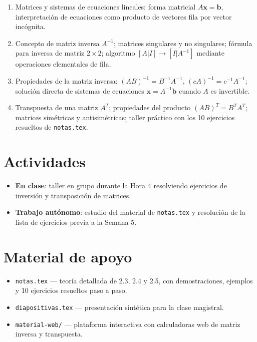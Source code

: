 \documentclass[11pt,letterpaper]{article}
\newcommand{\vv}[1]{\mathbf{#1}}
\begin{document}
\begin{enumerate}[leftmargin=1.2cm]
  \item[\textbf{Hora 1.}] Matrices y sistemas de ecuaciones lineales: forma matricial $A\vv{x}=\vv{b}$,
        interpretación de ecuaciones como producto de vectores fila por vector incógnita.
  \item[\textbf{Hora 2.}] Concepto de matriz inversa $A^{-1}$; matrices singulares y no singulares;
        fórmula para inversa de matriz $2\times 2$; algoritmo $[A|I]\to [I|A^{-1}]$ mediante
        operaciones elementales de fila.
  \item[\textbf{Hora 3.}] Propiedades de la matriz inversa: $(AB)^{-1}=B^{-1}A^{-1}$, $(c A)^{-1}=c^{-1}A^{-1}$;
        solución directa de sistemas de ecuaciones $\vv{x}=A^{-1}\vv{b}$ cuando $A$ es invertible.
  \item[\textbf{Hora 4.}] Transpuesta de una matriz $A^T$; propiedades del producto $(AB)^T=B^TA^T$;
        matrices simétricas y antisimétricas; taller práctico con los 10 ejercicios resueltos de \texttt{notas.tex}.
\end{enumerate}

\section{Actividades}

\begin{itemize}[leftmargin=1.2cm]
  \item \textbf{En clase}: taller en grupo durante la Hora 4 resolviendo ejercicios de inversión y
        transposición de matrices.
  \item \textbf{Trabajo autónomo}: estudio del material de \texttt{notas.tex} y resolución de la lista
        de ejercicios previa a la Semana 5.
\end{itemize}

\section{Material de apoyo}

\begin{itemize}[leftmargin=1.2cm]
  \item \texttt{notas.tex} --- teoría detallada de 2.3, 2.4 y 2.5, con demostraciones, ejemplos y
        10 ejercicios resueltos paso a paso.
  \item \texttt{diapositivas.tex} --- presentación sintética para la clase magistral.
  \item \texttt{material-web/} --- plataforma interactiva con calculadoras web de matriz inversa y
        transpuesta.
\end{itemize}
\end{document}
